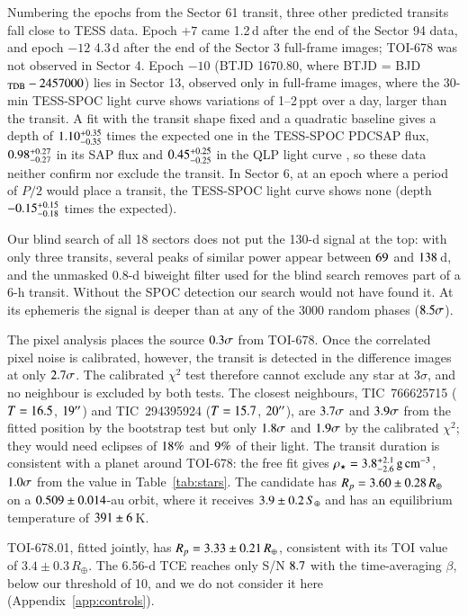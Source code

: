 \documentclass[twocolumn,numberedappendix,appendixfloats]{openjournal}
\newcommand{\rearth}{R_{\oplus}}
\newcommand{\gcc}{\,\mathrm{g\,cm^{-3}}}
\begin{document}
Numbering the epochs from the Sector 61 transit, three other predicted
transits fall close to TESS data. Epoch $+7$ came 1.2\,d after the end of the
Sector 94 data, and epoch $-12$ 4.3\,d after the end of the Sector 3
full-frame images; TOI-678 was not observed in Sector 4. Epoch $-10$ (BTJD
1670.80, where BTJD = BJD$_{\rm TDB} - 2457000$) lies in Sector 13, observed
only in full-frame images, where the 30-min TESS-SPOC light curve \citep{caldwell2020} shows variations of
1--2\,ppt over a day, larger than the transit. A fit with the transit shape
fixed and a quadratic baseline gives a depth of $1.10^{+0.35}_{-0.35}$ times the expected one
in the TESS-SPOC PDCSAP flux, $0.98^{+0.27}_{-0.27}$ in its SAP flux and $0.45^{+0.25}_{-0.25}$
in the QLP light curve \citep{huang2020,huang2020b}, so these data neither confirm nor
exclude the transit. In Sector 6, at an epoch where a period of $P/2$ would
place a transit, the TESS-SPOC light curve shows none (depth $-0.15^{+0.15}_{-0.18}$ times
the expected).

Our blind search of all 18 sectors does not put the 130-d signal at the top:
with only three transits, several peaks of similar power appear between
$69$ and $138$\,d, and the unmasked 0.8-d biweight filter used
for the blind search removes part of a 6-h transit. Without the SPOC detection
our search would not have found it. At its ephemeris the signal is deeper than
at any of the 3000 random phases ($8.5\sigma$).

The pixel analysis places the source $0.3\sigma$ from TOI-678. Once
the correlated pixel noise is calibrated, however, the transit is detected in
the difference images at only $2.7\sigma$. The calibrated $\chi^2$ test
therefore cannot exclude any star at $3\sigma$, and no neighbour is excluded by
both tests. The closest neighbours, TIC~766625715 ($T = 16.5$, $19''$) and
TIC~294395924 ($T = 15.7$, $20''$), are $3.7\sigma$ and
$3.9\sigma$ from the fitted position by the bootstrap test but only
$1.8\sigma$ and $1.9\sigma$ by the calibrated $\chi^2$; they would
need eclipses of $18\%$ and $9\%$ of their light. The transit duration is consistent with a
planet around TOI-678: the free fit gives $\rho_\star = \rhofreeTs\gcc$,
$1.0\sigma$ from the value in Table~\ref{tab:stars}. The candidate has $R_p =
\RpTs\,\rearth$ on a $0.509 \pm 0.014$-au orbit, where it receives $3.9 \pm 0.2\,S_\oplus$ and
has an equilibrium temperature of $391 \pm 6$\,K.

TOI-678.01, fitted jointly, has $R_p = \RpTsb\,\rearth$, consistent with its
TOI value of $3.4 \pm 0.3\,\rearth$. The 6.56-d TCE reaches only S/N $8.7$ with the time-averaging
$\beta$, below our threshold of 10, and we do not consider it here
(Appendix~\ref{app:controls}).
\end{document}
